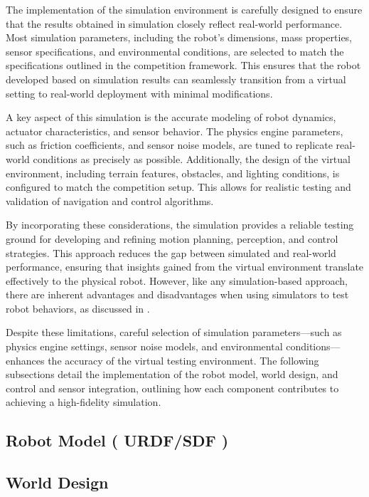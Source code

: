 \documentclass[../../main]{subfiles}
\begin{document}
The implementation of the simulation environment is carefully designed to ensure that the 
results obtained in simulation closely reflect real-world performance. Most simulation 
parameters, including the robot’s dimensions, mass properties, sensor specifications, 
and environmental conditions, are selected to match the specifications outlined in the 
competition framework. This ensures that the robot developed based on simulation 
results can seamlessly transition from a virtual setting to real-world deployment with 
minimal modifications.  

A key aspect of this simulation is the accurate modeling of robot dynamics, actuator 
characteristics, and sensor behavior. The physics engine parameters, such as friction 
coefficients, and sensor noise models, are tuned to replicate real-world 
conditions as precisely as possible. Additionally, the design of the virtual environment, 
including terrain features, obstacles, and lighting conditions, is configured to match 
the competition setup. This allows for realistic testing and validation of navigation 
and control algorithms.  

By incorporating these considerations, the simulation provides a reliable testing ground 
for developing and refining motion planning, perception, and control strategies. This 
approach reduces the gap between simulated and real-world performance, ensuring that 
insights gained from the virtual environment translate effectively to the physical robot. 
However, like any simulation-based approach, there are inherent advantages and 
disadvantages when using simulators to test robot behaviors, as discussed in \cite{lera2014mobile}. 

Despite these limitations, careful selection of simulation parameters---such as physics 
engine settings, sensor noise models, and environmental conditions---enhances the accuracy 
of the virtual testing environment. The following subsections detail the implementation 
of the robot model, world design, and control and sensor integration, outlining how each 
component contributes to achieving a high-fidelity simulation.

\subsection{Robot Model ( URDF/SDF )}
\subsection{World Design} 
\end{document}
